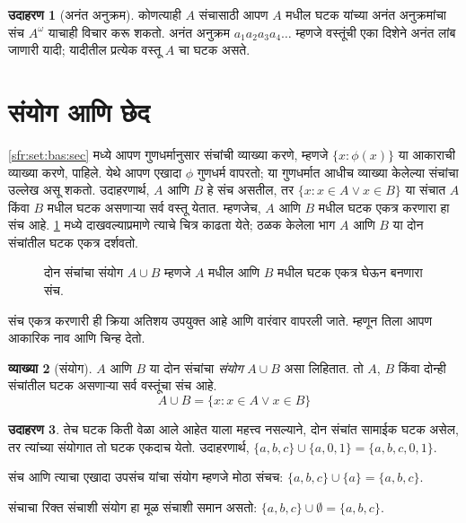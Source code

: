 \documentclass[11pt,a4paper,openany]{book}
\theoremstyle{definition}
\newtheorem{defn}{व्याख्या}[section]
\newtheorem{ex}[defn]{उदाहरण}
\newenvironment{explain}{}{}
\newcommand{\Setabs}[2]{\{#1:#2\}}
\newcommand{\olasset}[2][0.52\textwidth]{\centering\resizebox{#1}{!}{}}
\begin{document}
\begin{ex}[अनंत अनुक्रम]
कोणत्याही $A$ संचासाठी आपण $A$ मधील घटक यांच्या अनंत अनुक्रमांचा
संच $A^\omega$ याचाही विचार करू शकतो. अनंत अनुक्रम
$a_1a_2a_3a_4\dots$ म्हणजे वस्तूंची एका दिशेने अनंत लांब जाणारी यादी;
यादीतील प्रत्येक वस्तू $A$ चा घटक असते.
\end{ex}











\section{संयोग आणि छेद}\label{sfr:set:uni:sec}

\begin{explain}
\ref{sfr:set:bas:sec} मध्ये आपण गुणधर्मानुसार संचांची व्याख्या करणे,
म्हणजे $\Setabs{x}{\phi(x)}$ या आकाराची व्याख्या करणे, पाहिले.
येथे आपण एखादा $\phi$ गुणधर्म वापरतो; या गुणधर्मात आधीच व्याख्या केलेल्या
संचांचा उल्लेख असू शकतो. उदाहरणार्थ, $A$ आणि $B$ हे संच असतील,
तर $\Setabs{x}{x \in A \lor x \in B}$ या संचात $A$ किंवा $B$ मधील
घटक असणाऱ्या सर्व वस्तू येतात. म्हणजेच, $A$ आणि $B$ मधील
घटक एकत्र करणारा हा संच आहे. \ref{sfr:set:uni:fig:union} मध्ये
दाखवल्याप्रमाणे त्याचे चित्र काढता येते; ठळक केलेला भाग $A$ आणि $B$
या दोन संचांतील घटक एकत्र दर्शवतो.

\begin{figure}
  \olasset{assets/diagrams/union.tikz}
  \caption{दोन संचांचा संयोग $A \cup B$ म्हणजे $A$ मधील आणि $B$ मधील
    घटक एकत्र घेऊन बनणारा संच.}
  \label{sfr:set:uni:fig:union}
\end{figure}

संच एकत्र करणारी ही क्रिया अतिशय उपयुक्त आहे आणि वारंवार वापरली जाते.
म्हणून तिला आपण आकारिक नाव आणि चिन्ह देतो.
\end{explain}

\begin{defn}[संयोग]
$A$ आणि $B$ या दोन संचांचा \emph{संयोग} $A \cup B$ असा लिहितात.
तो $A$, $B$ किंवा दोन्ही संचांतील घटक असणाऱ्या सर्व वस्तूंचा संच आहे.
\[
A \cup B = \Setabs{x}{x \in A \lor x \in B}
\]
\end{defn}

\begin{ex}
तेच घटक किती वेळा आले आहेत याला महत्त्व नसल्याने, दोन संचांत
सामाईक घटक असेल, तर त्यांच्या संयोगात तो घटक एकदाच येतो.
उदाहरणार्थ, $\{ a, b, c\} \cup \{ a, 0, 1\} = \{a, b, c, 0, 1\}$.

संच आणि त्याचा एखादा उपसंच यांचा संयोग म्हणजे मोठा संचच:
$\{a,
b, c \} \cup \{a \} = \{a, b, c\}$.

संचाचा रिक्त संचाशी संयोग हा मूळ संचाशी समान असतो:
$\{a,
b, c \} \cup \emptyset = \{a, b, c \}$.
\end{ex}
\end{document}
